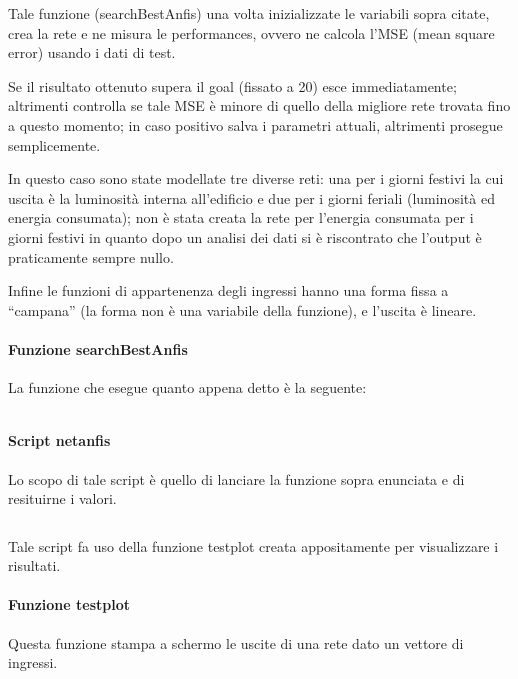Tale funzione (searchBestAnfis) una volta inizializzate le variabili sopra citate, crea la rete e ne misura le performances, ovvero ne calcola l'MSE (mean square error) usando i dati di test.

Se il risultato ottenuto supera il goal (fissato a 20) esce immediatamente; altrimenti controlla se tale MSE è minore di quello della migliore rete trovata fino a questo momento; in caso positivo salva i parametri attuali, altrimenti prosegue semplicemente.

In questo caso sono state modellate tre diverse reti: una per i giorni festivi la cui uscita è la luminosità interna all'edificio e due per i giorni feriali (luminosità ed energia consumata); non è stata creata la rete per l'energia consumata per i giorni festivi in quanto dopo un analisi dei dati si è riscontrato che l'output è praticamente sempre nullo.

Infine le funzioni di appartenenza degli ingressi hanno una forma fissa a “campana” (la forma non è una variabile della funzione), e l'uscita è lineare.


\paragraph{Funzione searchBestAnfis}
La funzione che esegue quanto appena detto è la seguente:

\inputminted[linenos=true,fontsize=\footnotesize]{matlab}{../../src/anfis/functions/searchBestAnfis.m}


\paragraph{Script netanfis}
Lo scopo di tale script è quello di lanciare la funzione sopra enunciata e di resituirne i valori.

\inputminted[linenos=true,fontsize=\footnotesize]{matlab}{../../src/netanfis.m}

Tale script fa uso della funzione testplot creata appositamente per visualizzare i risultati.


\paragraph{Funzione testplot}
Questa funzione stampa a schermo le uscite di una rete dato un vettore di ingressi.
\inputminted[linenos=true,fontsize=\footnotesize]{matlab}{../../src/anfis/functions/testplot.m}


